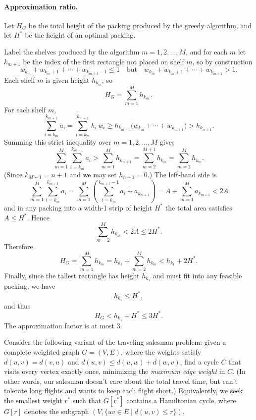\documentclass[11pt]{article}
\begin{document}
\begin{description}
\paragraph{Approximation ratio.}
Let $H_G$ be the total height of the packing produced by the greedy algorithm, and let $H^*$ be the height of an optimal packing.

Label the shelves produced by the algorithm $m=1,2,\dots,M$, and for each $m$ let $k_{m+1}$ be the index of the first rectangle not placed on shelf $m$, so by construction 
\[
w_{k_m}+w_{k_m+1}+\cdots+w_{k_{m+1}-1} \le 1
\quad\text{but}\quad
w_{k_m}+w_{k_m+1}+\cdots+w_{k_{m+1}} > 1.
\]
Each shelf $m$ is given height $h_{k_m}$, so
\[
H_G  = \sum_{m=1}^M h_{k_m}\,.
\]
For each shelf $m$,
\[
\sum_{i=k_m}^{k_{m+1}} a_i
= \sum_{i=k_m}^{k_{m+1}} h_i\,w_i
\ge h_{k_{m+1}} \bigl(w_{k_m}+ \cdots + w_{k_{m+1}}\bigr)
> h_{k_{m+1}}.
\]
Summing this strict inequality over $m=1,2,\dots,M$ gives
\[
\sum_{m=1}^M \sum_{i=k_m}^{k_{m+1}} a_i
> \sum_{m=1}^M h_{k_{m+1}}
= \sum_{m=2}^{M+1}h_{k_m}
= \sum_{m=2}^M h_{k_m}.
\]
(Since $k_{M+1}=n+1$ and we may set $h_{n+1}=0$.) The left-hand side is
\[
\sum_{m=1}^M \sum_{i=k_m}^{k_{m+1}} a_i 
= \sum_{m=1}^M \left(\sum_{i=k_m}^{k_{m+1}-1} a_i + a_{k_{m+1}}\right)
= A + \sum_{m=1}^M a_{k_{m+1}}
< 2A
\]
and in any packing into a width-1 strip of height $H^*$ the total area satisfies $A\le H^*$.  Hence
\[
\sum_{m=2}^M h_{k_m}
< 2A \le 2H^*.
\]
Therefore
\[
H_G
= \sum_{m=1}^M h_{k_m}
= h_{k_1} + \sum_{m=2}^M h_{k_m}
< h_{k_1}  +  2H^*.
\]
Finally, since the tallest rectangle has height $h_{k_1}$ and must fit into any feasible packing, we have
\[
h_{k_1} \le H^*,
\]
and thus
\[
H_G  
< h_{k_1}+H^*
\le 3 H^*.
\]
The approximation factor is at most 3.

\newpage
\item[Problem 10.2:]
Consider the following variant of the traveling salesman problem: given a complete
weighted graph $G=(V,E)$, where the weights satisfy $d(u,v)=d(v,u)$
and $d(u,v)\le d(u,w)+d(w,v)$, find a cycle $C$ that
visits every vertex exactly once, minimizing the 
{\em maximum edge weight\/} in $C$.  (In other words, our salesman
doesn't care about the total travel time, but can't tolerate
long flights and wants to keep each flight short.) 
Equivalently, we seek the smallest weight $r^*$
such that $G[r^*]$ contains a Hamiltonian cycle,
where $G[r]$ denotes the subgraph $(V,\{uv\in E\mid d(u,v)\le r\})$.


\end{description}
\end{document}
